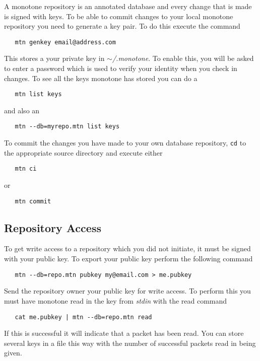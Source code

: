 \documentclass[12pt]{article}
\begin{document}
A monotone repository is an annotated database and every change that is made is signed with keys. To be able to commit changes to your local monotone repository you need to generate a key pair. To do this execute the command
\begin{verbatim}
   mtn genkey email@address.com 
\end{verbatim}
This stores a your private key in {\it $\sim$/.monotone}. To enable this, you will be asked to enter a password which is used to verify your identity when you check in changes. To see all the keys monotone has stored you can do a
\begin{verbatim}
   mtn list keys 
\end{verbatim}
and also an
\begin{verbatim}
   mtn --db=myrepo.mtn list keys 
\end{verbatim}
To commit the changes you have made to your own database repository, {\tt cd} to the appropriate source directory and execute either
\begin{verbatim}
   mtn ci
\end{verbatim}
or
\begin{verbatim}
   mtn commit 
\end{verbatim}

\subsection*{Repository Access}

To get write access to a repository which you did not initiate, it must be signed with your public key. To export your public key perform the following command
\begin{verbatim}
   mtn --db=repo.mtn pubkey my@email.com > me.pubkey 
\end{verbatim}
Send the repository owner your public key for write access. To perform this you must have monotone read in the key from {\it stdin} with the read command
\begin{verbatim}
   cat me.pubkey | mtn --db=repo.mtn read 
\end{verbatim}
If this is successful it will indicate that a packet has been read. You can store several keys in a file this way with the number of successful packets read in being given. 

\end{document}

